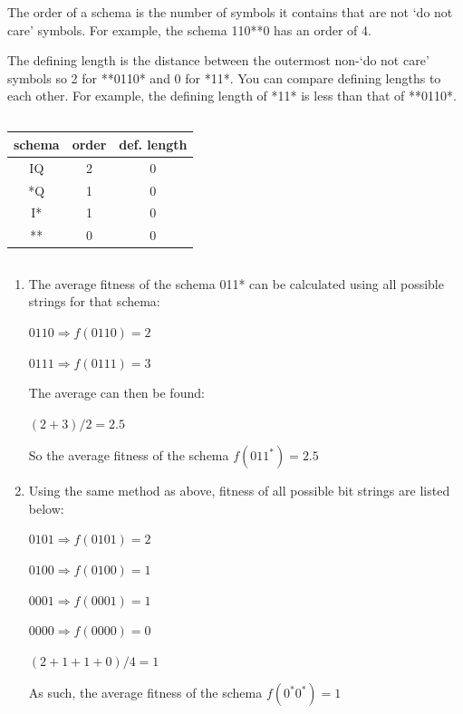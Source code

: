 \documentclass[a4paper]{report}
\begin{document}
The order of a schema is the number of symbols it contains that are not `do not care’ symbols. For example, the schema 110**0 has an order of 4.

The defining length is the distance between the outermost non-`do not care’ symbols so 2 for **0110* and 0 for *11*. You can compare defining lengths to each other. For example, the defining length of *11* is less than that of **0110*.

\subsection{}
\begin{tabular}{| c | c | c |}
    \hline
    schema & order & def. length \\ [0.5ex]
    \hline\hline
    IQ     & 2     & 0           \\
    \hline
    *Q     & 1     & 0           \\
    \hline
    I*     & 1     & 0           \\
    \hline
    **     & 0     & 0           \\
    \hline
\end{tabular}

\subsection{}
\begin{enumerate}
    \renewcommand{\theenumi}{\roman{enumi}}
    \item The average fitness of the schema 011* can be calculated using all possible strings for that schema:
    
    \(0110 \Rightarrow f(0110) = 2\)

    \(0111 \Rightarrow f(0111) = 3\)

    The average can then be found:

    \((2+3)/2 = 2.5\)

    So the average fitness of the schema \(f(011^*) = 2.5\)

    \item Using the same method as above, fitness of all possible bit strings are listed below:
    
    \(0101 \Rightarrow f(0101) = 2\)

    \(0100 \Rightarrow f(0100) = 1\)

    \(0001 \Rightarrow f(0001) = 1\)

    \(0000 \Rightarrow f(0000) = 0\)

    \((2+1+1+0)/4 = 1\)

    As such, the average fitness of the schema \(f(0^*0^*) = 1\)
\end{enumerate}
\renewcommand\bibname{References}


\end{document}
